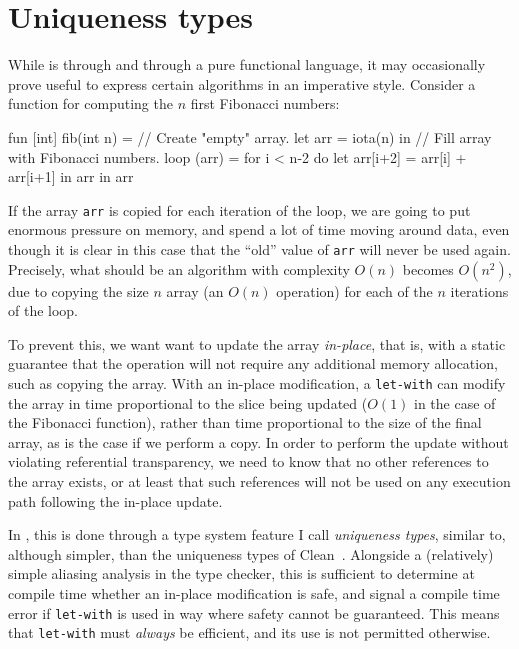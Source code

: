 \chapter{Uniqueness types}
\label{chap:uniqueness-types}

While \LO{} is through and through a pure functional language, it may
occasionally prove useful to express certain algorithms in an
imperative style.  Consider a function for computing the $n$ first
Fibonacci numbers:

\begin{colorcode}
fun [int] fib(int n) =
  // Create "empty" array.
  let arr = iota(n) in
  // Fill array with Fibonacci numbers.
  loop (arr) = for i < n-2 do
                 let arr[i+2] = arr[i] + arr[i+1]
                 in arr
  in arr
\end{colorcode}

If the array \texttt{arr} is copied for each iteration of the loop, we
are going to put enormous pressure on memory, and spend a lot of time
moving around data, even though it is clear in this case that the
``old'' value of \texttt{arr} will never be used again.  Precisely,
what should be an algorithm with complexity $O(n)$ becomes $O(n^2)$,
due to copying the size $n$ array (an $O(n)$ operation) for each of
the $n$ iterations of the loop.

To prevent this, we want want to update the array \textit{in-place},
that is, with a static guarantee that the operation will not require
any additional memory allocation, such as copying the array.  With an
in-place modification, a \texttt{let-with} can modify the array in
time proportional to the slice being updated ($O(1)$ in the case of
the Fibonacci function), rather than time proportional to the size of
the final array, as is the case if we perform a copy.  In order to
perform the update without violating referential transparency, we need
to know that no other references to the array exists, or at least that
such references will not be used on any execution path following the
in-place update.

In \LO{}, this is done through a type system feature I call
\textit{uniqueness types}, similar to, although simpler, than the
uniqueness types of
Clean~\cite{clean-uniqueness-types}\cite{barendsen1996uniqueness}.
Alongside a (relatively) simple aliasing analysis in the type checker,
this is sufficient to determine at compile time whether an in-place
modification is safe, and signal a compile time error if
\texttt{let-with} is used in way where safety cannot be guaranteed.
This means that \texttt{let-with} must \textit{always} be efficient,
and its use is not permitted otherwise.

